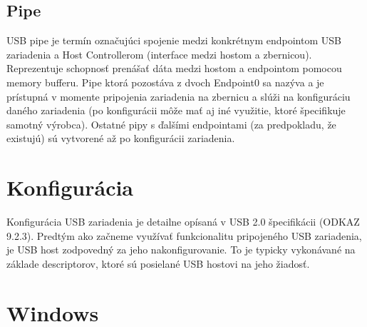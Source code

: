 \subsection{Pipe}
USB pipe je termín označujúci spojenie medzi konkrétnym endpointom USB zariadenia a Host Controllerom (interface medzi hostom a zbernicou). Reprezentuje schopnosť prenášať dáta medzi hostom a endpointom pomocou memory bufferu. Pipe ktorá pozostáva z dvoch Endpoint0 sa nazýva  a je prístupná v momente pripojenia zariadenia na zbernicu a slúži na konfiguráciu daného zariadenia (po konfigurácii môže mať aj iné využitie, ktoré špecifikuje samotný výrobca). Ostatné pipy s ďalšími endpointami (za predpokladu, že existujú) sú vytvorené až po konfigurácii zariadenia. 



\section{Konfigurácia}
Konfigurácia USB zariadenia je detailne opísaná v USB 2.0 špecifikácii (ODKAZ 9.2.3). Predtým ako začneme využívať funkcionalitu pripojeného USB zariadenia, je USB host zodpovedný za jeho nakonfigurovanie. To je typicky vykonávané na základe descriptorov, ktoré sú posielané USB hostovi na jeho žiadosť. 




\section{Windows}






